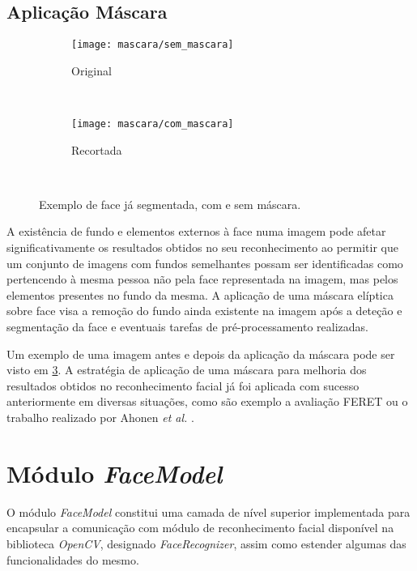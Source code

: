 \subsection{Aplicação Máscara} \label{sec:mascara}

\begin{figure}[t]
        \centering
        \begin{subfigure}[b]{0.2\textwidth}
                \centering
                \texttt{[image: mascara/sem\_mascara]}
                \caption{Original}
                \label{fig:sem-mascara}
        \end{subfigure}%
        ~ ~ ~
        \begin{subfigure}[b]{0.2\textwidth}
                \centering
                \texttt{[image: mascara/com\_mascara]}
                \caption{Recortada}
                \label{fig:com-mascara}
        \end{subfigure}
        ~ 
        \caption{Exemplo de face já segmentada, com e sem máscara.}\label{fig:mascara}
\end{figure}

A existência de fundo e elementos externos à face numa imagem pode afetar significativamente os resultados obtidos no seu reconhecimento ao permitir que um conjunto de imagens com fundos semelhantes possam ser identificadas como pertencendo à mesma pessoa não pela face representada na imagem, mas pelos elementos presentes no fundo da mesma. A aplicação de uma máscara elíptica sobre face visa a remoção do fundo ainda existente na imagem após a deteção e segmentação da face e eventuais tarefas de pré-processamento realizadas.

Um exemplo de uma imagem antes e depois da aplicação da máscara pode ser visto em \ref{fig:mascara}. A estratégia de aplicação de uma máscara para melhoria dos resultados obtidos no reconhecimento facial já foi aplicada com sucesso anteriormente em diversas situações, como são exemplo a avaliação FERET \cite{Phillips2000} ou o trabalho realizado por Ahonen \textit{et al.} \cite{ahonen2004face}.

\section{Módulo \textit{FaceModel}} \label{sec:facemodel}
O módulo \textit{FaceModel} constitui uma camada de nível superior implementada para encapsular a comunicação com módulo de reconhecimento facial disponível na biblioteca \textit{OpenCV}, designado \textit{FaceRecognizer}, assim como estender algumas das funcionalidades do mesmo. 

